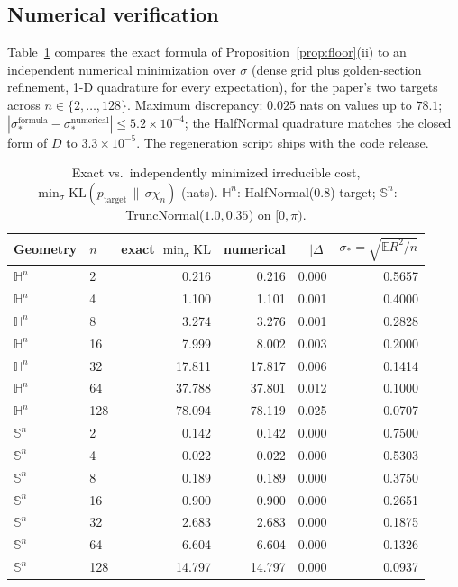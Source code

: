 \documentclass{article}
\newcommand{\KL}{\mathrm{KL}}
\theoremstyle{definition}
\theoremstyle{remark}
\newcommand{\SSS}{\mathbb{S}}
\newcommand{\HH}{\mathbb{H}}
\begin{document}
\subsection{Numerical verification}
Table~\ref{tab:floor_verification} compares the exact formula of Proposition~\ref{prop:floor}(ii) to an independent numerical minimization over $\sigma$ (dense grid plus golden-section refinement, 1-D quadrature for every expectation), for the paper's two targets across $n\in\{2,\dots,128\}$. Maximum discrepancy: $0.025$ nats on values up to $78.1$; $|\sigma_*^{\text{formula}}-\sigma_*^{\text{numerical}}|\le5.2\times10^{-4}$; the HalfNormal quadrature matches the closed form of $D$ to $3.3\times10^{-5}$. The regeneration script ships with the code release.

\begin{table}[h]
\centering
\caption{Exact vs.\ independently minimized irreducible cost, $\min_\sigma\KL(p_{\text{target}}\,\|\,\sigma\chi_n)$ (nats). $\HH^n$: HalfNormal($0.8$) target; $\SSS^n$: TruncNormal($1.0,0.35$) on $[0,\pi)$.}
\label{tab:floor_verification}
\small
\begin{tabular}{llrrrr}
\toprule
Geometry & $n$ & exact $\min_\sigma\mathrm{KL}$ & numerical & $|\Delta|$ & $\sigma_*=\sqrt{\mathbb{E}R^2/n}$\\
\midrule
$\HH^n$ & 2 & 0.216 & 0.216 & 0.000 & 0.5657\\
$\HH^n$ & 4 & 1.100 & 1.101 & 0.001 & 0.4000\\
$\HH^n$ & 8 & 3.274 & 3.276 & 0.001 & 0.2828\\
$\HH^n$ & 16 & 7.999 & 8.002 & 0.003 & 0.2000\\
$\HH^n$ & 32 & 17.811 & 17.817 & 0.006 & 0.1414\\
$\HH^n$ & 64 & 37.788 & 37.801 & 0.012 & 0.1000\\
$\HH^n$ & 128 & 78.094 & 78.119 & 0.025 & 0.0707\\
$\SSS^n$ & 2 & 0.142 & 0.142 & 0.000 & 0.7500\\
$\SSS^n$ & 4 & 0.022 & 0.022 & 0.000 & 0.5303\\
$\SSS^n$ & 8 & 0.189 & 0.189 & 0.000 & 0.3750\\
$\SSS^n$ & 16 & 0.900 & 0.900 & 0.000 & 0.2651\\
$\SSS^n$ & 32 & 2.683 & 2.683 & 0.000 & 0.1875\\
$\SSS^n$ & 64 & 6.604 & 6.604 & 0.000 & 0.1326\\
$\SSS^n$ & 128 & 14.797 & 14.797 & 0.000 & 0.0937\\
\bottomrule
\end{tabular}
\end{table}
\end{document}
